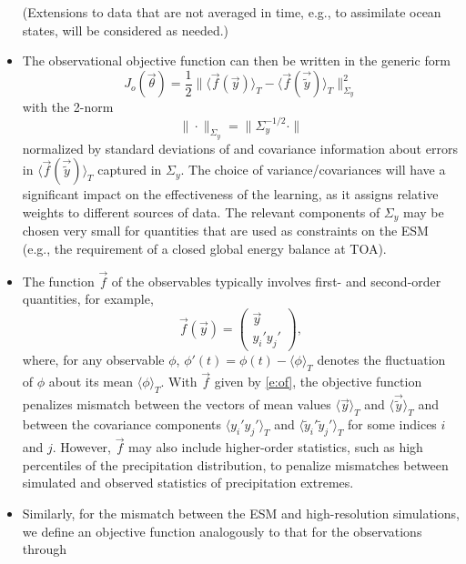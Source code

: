 \documentclass{article}
\begin{document}
\begin{itemize}
    (Extensions to data that are not averaged in time, e.g., to assimilate ocean states, will be considered as needed.) 
    \item The observational objective function can then be written in the generic form
    \begin{equation}\label{e:obj_o}
    J_o(\vec{\theta})=\frac{1}{2}\| \langle \vec{f}(\vec{y})  \rangle_T - \langle \vec{f}(\vec{\tilde y})
    \rangle_T \|_{\Sigma_y}^2
    \end{equation}
    with the 2-norm
    \begin{equation}
    \|\cdot\|_{\Sigma_y}=\|\Sigma_y^{-1/2}\cdot\|
    \end{equation}
    normalized by standard deviations of and covariance information about errors in $\langle \vec{f}(\vec{\tilde y}) \rangle_T$ captured in $\Sigma_y$. The choice of variance/covariances will have a significant impact on the effectiveness of the learning, as it assigns relative weights to different sources of data. The relevant components of $\Sigma_y$ may be chosen very small for quantities that are used as constraints on the ESM (e.g., the requirement of a closed global energy balance at TOA).
    \item The function $\vec{f}$ of the observables typically involves first- and second-order quantities, for example,
    \begin{equation}
    \vec{f}(\vec{y}) = \left( 
    \begin{array}{c} 
    \vec{y}\\
    y_i' y_j'
    \end{array}
    \right),
    \label{e:of}
    \end{equation}
    where, for any observable $\phi$, $\phi'(t) = \phi(t) - \langle \phi \rangle_T$ denotes the fluctuation of $\phi$ about its mean $\langle \phi \rangle_T$. With $\vec{f}$ given by \eqref{e:of}, the objective function penalizes mismatch between the vectors of mean values $\langle \vec{y} \rangle_T$ and $\langle \vec{\tilde y}\rangle_T$ and between the covariance components $\langle y_i' y_j' \rangle_T$ and  $\langle \tilde y_i' \tilde y_j' \rangle_T$ for some indices $i$ and $j$. However, $\vec{f}$ may also include higher-order statistics, such as high percentiles of the precipitation distribution, to penalize mismatches between simulated and observed statistics of precipitation extremes. 
    \item Similarly, for the mismatch between the ESM and high-resolution simulations, we define an objective function analogously to that for the observations through

\end{itemize}
\end{document}
